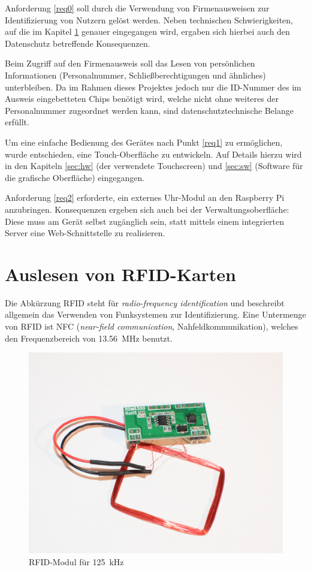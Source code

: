 \documentclass[11pt,a4paper]{IEEEtran}
\begin{document}
Anforderung \ref{req0} soll durch die Verwendung von Firmenausweisen zur
Identifizierung von Nutzern gelöst werden. Neben technischen Schwierigkeiten,
auf die im Kapitel \ref{sec:rfid} genauer eingegangen wird, ergaben sich
hierbei auch den Datenschutz betreffende Konsequenzen.

Beim Zugriff auf den Firmenausweis soll das Lesen von persönlichen
Informationen (Personalnummer, Schließberechtigungen und ähnliches)
unterbleiben. Da im Rahmen dieses Projektes jedoch nur die ID-Nummer des im
Ausweis eingebetteten Chips benötigt wird, welche nicht ohne weiteres der
Personalnummer zugeordnet werden kann, sind datenschutztechnische Belange
erfüllt.

Um eine einfache Bedienung des Gerätes nach Punkt \ref{req1} zu ermöglichen,
wurde entschieden, eine Touch-Oberfläche zu entwickeln. Auf Details hierzu wird
in den Kapiteln \ref{sec:hw} (der verwendete Touchscreen) und \ref{sec:sw}
(Software für die grafische Oberfläche) eingegangen.

Anforderung \ref{req2} erforderte, ein externes Uhr-Modul an den Raspberry Pi
anzubringen. Konsequenzen ergeben sich auch bei der Verwaltungsoberfläche:
Diese muss am Gerät selbst zugänglich sein, statt mittels einem integrierten 
Server eine Web-Schnittstelle zu realisieren.

\section{Auslesen von RFID-Karten} \label{sec:rfid}

Die Abkürzung RFID steht für \emph{radio-frequency identification} und
beschreibt allgemein das Verwenden von Funksystemen zur Identifizierung. Eine
Untermenge von RFID ist NFC (\emph{near-field communication},
Nahfeldkommunikation), welches den Frequenzbereich von \SI{13,56}{\mega\hertz}
benutzt.

\begin{figure}[ht]
    \label{fig:rfid125khz}
    \centering
    \includegraphics[width=.8\columnwidth]{images/125khz_rfid}
    \caption{RFID-Modul für \SI{125}{\kilo\hertz}}
\end{figure}
\end{document}
